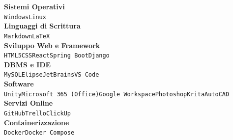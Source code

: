 \documentclass[10pt]{developercv} %
\begin{document}
	
\textbf{Sistemi Operativi} \\
\texttt{Windows}\slashsep\texttt{Linux}\\
\textbf{Linguaggi di Scrittura}\\
\texttt{Markdown}\slashsep\texttt{LaTeX}\\
\textbf{Sviluppo Web e Framework}\\
\texttt{HTML5}\slashsep\texttt{CSS}\slashsep\texttt{React}\slashsep\texttt{Spring Boot}\slashsep\texttt{Django}\\
\textbf{DBMS e IDE}\\
\texttt{MySQL}\slashsep\texttt{Elipse}\slashsep\texttt{JetBrains}\slashsep\texttt{VS Code}\\
\textbf{Software}\\
\texttt{Unity}\slashsep\texttt{Microsoft 365 (Office)}\slashsep\texttt{Google Workspace}\slashsep\texttt{Photoshop}\slashsep\texttt{Krita}\slashsep\texttt{AutoCAD}\\
\textbf{Servizi Online}\\
\texttt{GitHub}\slashsep\texttt{Trello}\slashsep\texttt{ClickUp}\\
\textbf{Containerizzazione}\\
\texttt{Docker}\slashsep\texttt{Docker Compose}\\


%
%	
%	
%	
%	
%	
\end{document}
